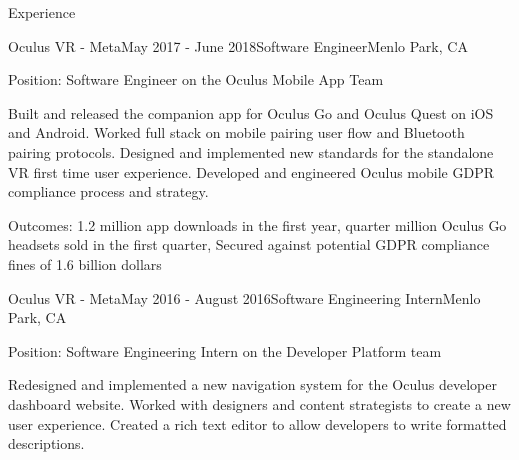 \documentclass{resume} %
\begin{document}

\begin{rSection}{Experience}




  \begin{rSubsection}{Oculus VR - Meta}{May 2017 - June 2018}{Software Engineer}{Menlo Park, CA}
  \item Position: Software Engineer on the Oculus Mobile App Team
  \item Built and released the companion app for Oculus Go and Oculus
      Quest on iOS and Android.
      Worked full stack on mobile pairing user flow and Bluetooth pairing protocols.
      Designed and implemented new standards for the standalone VR first time user experience. 
      Developed and engineered Oculus mobile GDPR compliance process and strategy.
  \item Outcomes: 1.2 million app downloads in the first year, quarter million Oculus Go headsets sold in the first quarter, 
      Secured against potential GDPR compliance fines of 1.6 billion dollars 
  \end{rSubsection}


  \begin{rSubsection}{Oculus VR - Meta}{May 2016 - August 2016}{Software Engineering Intern}{Menlo Park, CA}
  \item Position: Software Engineering Intern on the Developer Platform team
  \item Redesigned and implemented a new navigation system for the Oculus
      developer dashboard website. Worked with designers and content strategists
      to create a new user experience. Created a rich text editor to allow
      developers to write formatted descriptions. 
  \end{rSubsection}




\end{rSection}
\end{document}
